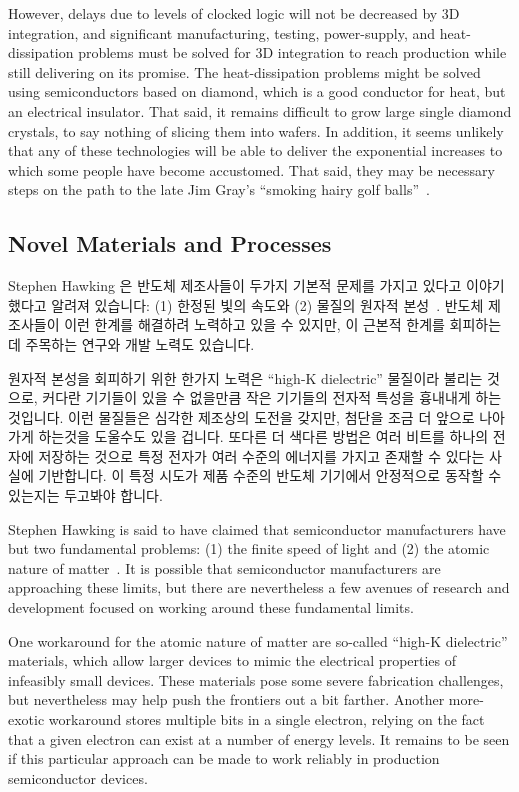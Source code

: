 However, delays due to levels of clocked logic will not be decreased
by 3D integration, and significant manufacturing, testing, power-supply,
and heat-dissipation problems must be solved for 3D integration to
reach production while still delivering on its promise.
The heat-dissipation problems might be solved using
semiconductors based on diamond, which is a good conductor
for heat, but an electrical insulator.
That said, it remains difficult to grow large single diamond crystals,
to say nothing of slicing them into wafers.
In addition, it seems unlikely that any of these technologies will be able to
deliver the exponential increases to which some people have become accustomed.
That said, they may be necessary steps on the path to the late Jim Gray's
``smoking hairy golf balls''~\cite{JimGray2002SmokingHairyGolfBalls}.

\fi

\subsection{Novel Materials and Processes}
\label{sec:cpu:Novel Materials and Processes}

Stephen Hawking 은 반도체 제조사들이 두가지 기본적 문제를 가지고 있다고 이야기
했다고 알려져 있습니다: (1) 한정된 빛의 속도와 (2) 물질의 원자적
본성~\cite{BryanGardiner2007}.
반도체 제조사들이 이런 한계를 해결하려 노력하고 있을 수 있지만, 이 근본적
한계를 회피하는데 주목하는 연구와 개발 노력도 있습니다.

원자적 본성을 회피하기 위한 한가지 노력은 ``high-K dielectric'' 물질이라 불리는
것으로, 커다란 기기들이 있을 수 없을만큼 작은 기기들의 전자적 특성을 흉내내게
하는 것입니다.
이런 물질들은 심각한 제조상의 도전을 갖지만, 첨단을 조금 더 앞으로 나아가게
하는것을 도울수도 있을 겁니다.
또다른 더 색다른 방법은 여러 비트를 하나의 전자에 저장하는 것으로 특정 전자가
여러 수준의 에너지를 가지고 존재할 수 있다는 사실에 기반합니다.
이 특정 시도가 제품 수준의 반도체 기기에서 안정적으로 동작할 수 있는지는
두고봐야 합니다.

\iffalse

Stephen Hawking is said to have claimed that semiconductor manufacturers
have but two fundamental problems: (1) the finite speed of light and
(2) the atomic nature of matter~\cite{BryanGardiner2007}.
It is possible that semiconductor manufacturers are approaching these
limits, but there are nevertheless a few avenues of research and
development focused on working around these fundamental limits.

One workaround for the atomic nature of matter are so-called
``high-K dielectric'' materials, which allow larger devices to mimic the
electrical properties of infeasibly small devices.
These materials pose some severe fabrication challenges, but nevertheless
may help push the frontiers out a bit farther.
Another more-exotic workaround stores multiple bits in a single electron,
relying on the fact that a given electron can exist at a number of
energy levels.
It remains to be seen if this particular approach can be made to work
reliably in production semiconductor devices.

